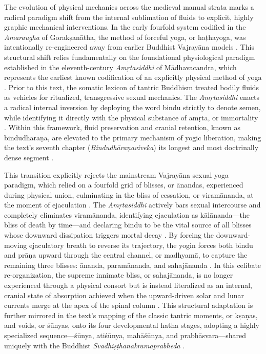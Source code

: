 \documentclass[11pt,twoside,letterpaper]{article}
\begin{document}

The evolution of physical mechanics across the medieval manual strata marks a radical paradigm shift from the internal sublimation of fluids to explicit, highly graphic mechanical interventions. In the early fourfold system codified in the \textit{Amaraugha} of Gorakṣanātha, the method of forceful yoga, or haṭhayoga, was intentionally re-engineered away from earlier Buddhist Vajrayāna models \citep{Birch2024}. This structural shift relies fundamentally on the foundational physiological paradigm established in the eleventh-century \textit{Amṛtasiddhi} of Mādhavacandra, which represents the earliest known codification of an explicitly physical method of yoga \citep{Mallinson2021}. Prior to this text, the somatic lexicon of tantric Buddhism treated bodily fluids as vehicles for ritualized, transgressive sexual mechanics. The \textit{Amṛtasiddhi} enacts a radical internal inversion by deploying the word bindu strictly to denote semen, while identifying it directly with the physical substance of amṛta, or immortality \citep{Mallinson2021}. Within this framework, fluid preservation and cranial retention, known as bindudhāraṇa, are elevated to the primary mechanism of yogic liberation, making the text's seventh chapter (\textit{Bindudhāraṇaviveka}) its longest and most doctrinally dense segment \citep{Mallinson2021}.

This transition explicitly rejects the mainstream Vajrayāna sexual yoga paradigm, which relied on a fourfold grid of blisses, or ānandas, experienced during physical union, culminating in the bliss of cessation, or viramānanda, at the moment of ejaculation \citep{Mallinson2021}. The \textit{Amṛtasiddhi} actively bars sexual intercourse and completely eliminates viramānanda, identifying ejaculation as kālānanda—the bliss of death by time—and declaring bindu to be the vital source of all blisses whose downward dissipation triggers mortal decay \citep{Mallinson2021}. By forcing the downward-moving ejaculatory breath to reverse its trajectory, the yogin forces both bindu and prāṇa upward through the central channel, or madhyamā, to capture the remaining three blisses: ānanda, paramānanda, and sahajānanda \citep{Mallinson2021}. In this celibate re-organization, the supreme innimate bliss, or sahajānanda, is no longer experienced through a physical consort but is instead literalized as an internal, cranial state of absorption achieved when the upward-driven solar and lunar currents merge at the apex of the spinal column \citep{Mallinson2021}. This structural adaptation is further mirrored in the text's mapping of the classic tantric moments, or kṣaṇas, and voids, or śūnyas, onto its four developmental hatha stages, adopting a highly specialized sequence—śūnya, atiśūnya, mahāśūnya, and prabhāsvara—shared uniquely with the Buddhist \textit{Svādhiṣṭhānakramaprabheda} \citep{Mallinson2021}.
\end{document}
